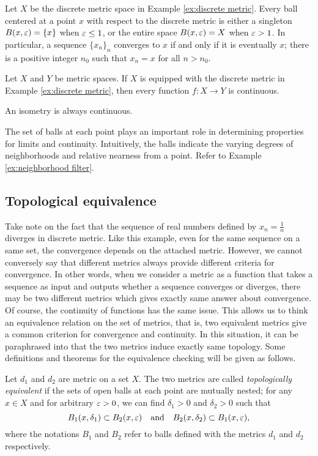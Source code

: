 \documentclass{../crs}
\begin{document}
\begin{ex}
Let $X$ be the discrete metric space in Example \ref{ex:discrete metric}.
Every ball centered at a point $x$ with respect to the discrete metric is either a singleton $B(x,\varepsilon)=\{x\}$ when $\varepsilon\le1$, or the entire space $B(x,\varepsilon)=X$ when $\varepsilon>1$.
In particular, a sequence $\{x_n\}_n$ converges to $x$ if and only if it is eventually $x$; there is a positive integer $n_0$ such that $x_n=x$ for all $n>n_0$.
\end{ex}
\begin{ex}
Let $X$ and $Y$ be metric spaces.
If $X$ is equipped with the discrete metric in Example \ref{ex:discrete metric}, then every function $f:X\to Y$ is continuous.
\end{ex}
\begin{ex}
An isometry is always continuous.
\end{ex}

The set of balls at each point plays an important role in determining properties for limits and continuity.
Intuitively, the balls indicate the varying degrees of neighborhoods and relative nearness from a point.
Refer to Example \ref{ex:neighborhood filter}.



\subsection{Topological equivalence}
Take note on the fact that the sequence of real numbers defined by $x_n=\frac1n$ diverges in discrete metric.
Like this example, even for the same sequence on a same set, the convergence depends on the attached metric.
However, we cannot conversely say that different metrics always provide different criteria for convergence.
In other words, when we consider a metric as a function that takes a sequence as input and outputs whether a sequence converges or diverges, there may be two different metrics which gives exactly same answer about convergence.
Of course, the continuity of functions has the same issue.
This allows us to think an equivalence relation on the set of metrics, that is, two equivalent metrics give a common criterion for convergence and continuity.
In this situation, it can be paraphrased into that the two metrics induce exactly same topology.
Some definitions and theorems for the equivalence checking will be given as follows.

\begin{defn}
Let $d_1$ and $d_2$ are metric on a set $X$.
The two metrics are called \emph{topologically equivalent} if the sets of open balls at each point are mutually nested;
for any $x\in X$ and for arbitrary $\varepsilon>0$, we can find $\delta_1>0$ and $\delta_2>0$ such that
\[B_1(x,\delta_1)\subset B_2(x,\varepsilon)\quad\text{and}\quad B_2(x,\delta_2)\subset B_1(x,\varepsilon),\]
where the notations $B_1$ and $B_2$ refer to balls defined with the metrics $d_1$ and $d_2$ respectively.
\end{defn}
\end{document}
